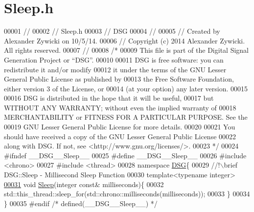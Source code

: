 \hypertarget{_sleep_8h_source}{\section{Sleep.\+h}
\label{_sleep_8h_source}
}

\begin{DoxyCode}
00001 \textcolor{comment}{//}
00002 \textcolor{comment}{//  Sleep.h}
00003 \textcolor{comment}{//  DSG}
00004 \textcolor{comment}{//}
00005 \textcolor{comment}{//  Created by Alexander Zywicki on 10/5/14.}
00006 \textcolor{comment}{//  Copyright (c) 2014 Alexander Zywicki. All rights reserved.}
00007 \textcolor{comment}{//}
00008 \textcolor{comment}{/*}
00009 \textcolor{comment}{ This file is part of the Digital Signal Generation Project or “DSG”.}
00010 \textcolor{comment}{}
00011 \textcolor{comment}{ DSG is free software: you can redistribute it and/or modify}
00012 \textcolor{comment}{ it under the terms of the GNU Lesser General Public License as published by}
00013 \textcolor{comment}{ the Free Software Foundation, either version 3 of the License, or}
00014 \textcolor{comment}{ (at your option) any later version.}
00015 \textcolor{comment}{}
00016 \textcolor{comment}{ DSG is distributed in the hope that it will be useful,}
00017 \textcolor{comment}{ but WITHOUT ANY WARRANTY; without even the implied warranty of}
00018 \textcolor{comment}{ MERCHANTABILITY or FITNESS FOR A PARTICULAR PURPOSE.  See the}
00019 \textcolor{comment}{ GNU Lesser General Public License for more details.}
00020 \textcolor{comment}{}
00021 \textcolor{comment}{ You should have received a copy of the GNU Lesser General Public License}
00022 \textcolor{comment}{ along with DSG.  If not, see <http://www.gnu.org/licenses/>.}
00023 \textcolor{comment}{ */}
00024 \textcolor{preprocessor}{#ifndef \_\_DSG\_\_Sleep\_\_}
00025 \textcolor{preprocessor}{#define \_\_DSG\_\_Sleep\_\_}
00026 \textcolor{preprocessor}{#include <chrono>}
00027 \textcolor{preprocessor}{#include <thread>}
00028 \textcolor{keyword}{namespace }\hyperlink{namespace_d_s_g}{DSG}\{\textcolor{comment}{}
00029 \textcolor{comment}{    //!\(\backslash\)brief DSG::Sleep - Millisecond Sleep Function}
00030 \textcolor{comment}{}    \textcolor{keyword}{template}<\textcolor{keyword}{typename} \textcolor{keywordtype}{int}eger>
\hypertarget{_sleep_8h_source_l00031}{}\hyperlink{namespace_d_s_g_a012c968132bda114752f8ae012a1f441}{00031}     \textcolor{keywordtype}{void} \hyperlink{namespace_d_s_g_a012c968132bda114752f8ae012a1f441}{Sleep}(integer \textcolor{keyword}{const}& milliseconds)\{
00032         std::this\_thread::sleep\_for(std::chrono::milliseconds(milliseconds));
00033     \}
00034 \}
00035 \textcolor{preprocessor}{#endif }\textcolor{comment}{/* defined(\_\_DSG\_\_Sleep\_\_) */}\textcolor{preprocessor}{}
\end{DoxyCode}
